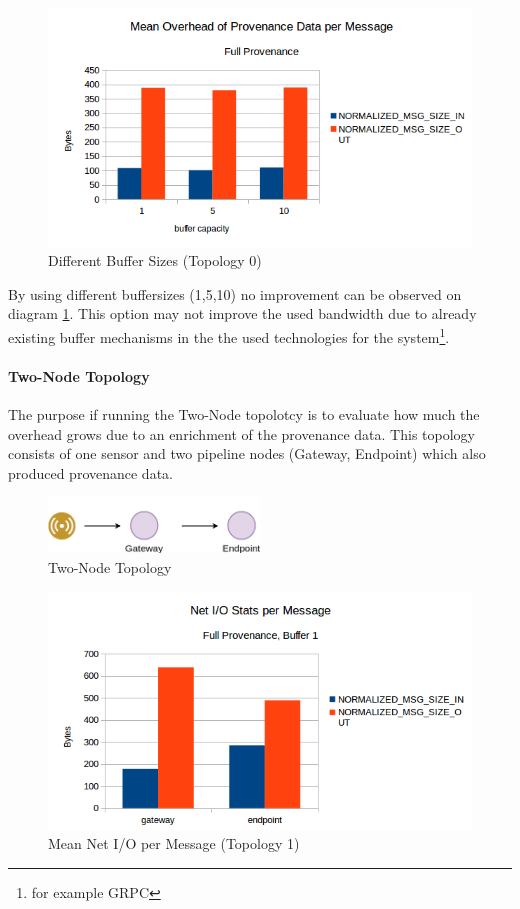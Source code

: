 \begin{figure}[H]
	\center
	\includegraphics[width=\textwidth]{figures/overheaddiagram2.png}
	\caption{Different Buffer Sizes (Topology 0)}
	\label{fig:buffersizes}
\end{figure}

By using different buffersizes (1,5,10) no improvement can be observed on diagram \ref{fig:buffersizes}. This option may not improve the used bandwidth due to already existing buffer mechanisms in the the used technologies for the system\footnote{for example GRPC}.


\paragraph*{Two-Node Topology}
The purpose if running the Two-Node topolotcy is to evaluate how much the overhead grows due to an enrichment of the provenance data. This topology consists of one sensor and two pipeline nodes (Gateway, Endpoint) which also produced provenance data.

\begin{figure}[H]
	\center
	\includegraphics[width=0.5\textwidth]{figures/dataoverheadtopolabeled1.png}
	\caption{Two-Node Topology}
	\label{fig:topo1}
\end{figure}

\begin{figure}[H]
	\center
	\includegraphics[width=\textwidth]{figures/overheaddiagram3.png}
	\caption{Mean Net I/O per Message (Topology 1)}
	\label{fig:topo1meanpermsg}
\end{figure}



